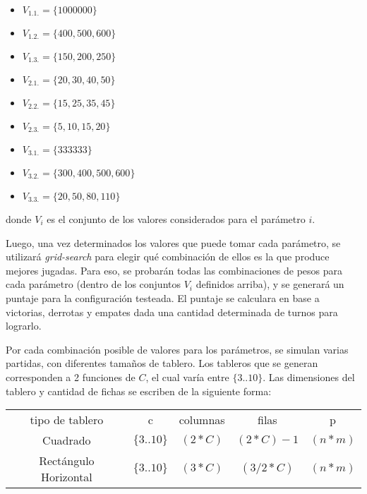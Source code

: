 \documentclass[12pt,a4paper]{article}
\begin{document}
        \begin{itemize}
            \item $V_{1.1.} =  \{1000000\} $
            \item $V_{1.2.} =  \{400, 500, 600\} $
            \item $V_{1.3.} =  \{150, 200, 250\} $
            \item $V_{2.1.} =  \{20, 30, 40, 50\} $
            \item $V_{2.2.} =  \{15, 25, 35, 45\} $
            \item $V_{2.3.} =  \{5, 10, 15, 20\} $
            \item $V_{3.1.} =  \{333333\} $
            \item $V_{3.2.} =  \{300, 400, 500, 600\} $
            \item $V_{3.3.} =  \{20, 50, 80, 110\} $
        \end{itemize}
    donde $V_{i}$ es el conjunto de los valores considerados para el parámetro $i$.
    
    Luego, una vez determinados los valores que puede tomar cada parámetro, se utilizará \textit{grid-search} para elegir qué combinación de ellos es la que produce mejores jugadas. Para eso, se probarán todas las combinaciones de pesos para cada parámetro (dentro de los conjuntos $V_{i}$ definidos arriba), y se generará un puntaje para la configuración testeada. El puntaje se calculara en base a victorias, derrotas y empates dada una cantidad determinada de turnos para lograrlo.
    
    Por cada combinación posible de valores para los parámetros, se simulan varias partidas, con diferentes tamaños de tablero. Los tableros que se generan corresponden a 2 funciones de $C$, el cual varía entre $\{3..10\}$. Las dimensiones del tablero y cantidad de fichas se escriben de la siguiente forma:
    
    \begin{center}
		\begin{tabular}{ | c || c | c | c | c | }
		\hline
		tipo de tablero &  c &  columnas & filas & p \\ \hhline{|=#=|=|=|=|}
		    Cuadrado & $\{3..10\}$ &  $(2 * C)$ & $(2 * C) - 1$ & $ (n * m)$ \\ \hline
		    Rectángulo Horizontal & $\{3..10\}$ &  $(3 * C)$ &  $(3/2 * C)$ & $ (n * m)$ \\ \hline
		\end{tabular}
    \end{center}
    
\end{document}
